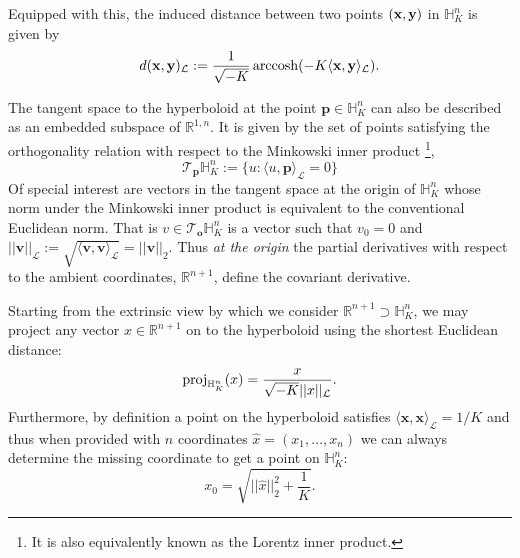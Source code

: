 Equipped with this, the induced distance between two points $(\mathbf{x},\mathbf{y})$ in $\mathbb{H}^{n}_K$ is given by
\begin{equation}
    d(\textbf{x},\textbf{y})_{\mathcal{L}} := \frac{1}{\sqrt{-K}}\operatorname{arccosh}(-K \langle \textbf{x}, \textbf{y} \rangle_{\mathcal{L}}).
\end{equation}

The tangent space to the hyperboloid at the point $\textbf{p} \in \mathbb{H}_K^n$ can also be described as an embedded subspace of $\mathbb{R}^{1,n}$.  
It is given by the set of points satisfying the orthogonality relation with respect to the Minkowski inner product \footnote{It is also equivalently known as the Lorentz inner product.},
\begin{equation}
   \mathcal{T}_{\textbf{p}}\mathbb{H}^{n}_K := \{ u: \langle u, \textbf{p} \rangle_{\mathcal{L}} = 0\}
\end{equation}
Of special interest are vectors in the tangent space at the origin of $\mathbb{H}^{n}_K$ whose norm under the Minkowski inner product is equivalent to the conventional Euclidean norm. That is $v \in \mathcal{T}_{\textbf{o}}\mathbb{H}^{n}_K$ is a vector such that $v_0 = 0$ and $||\textbf{v}||_{\mathcal{L}} := \sqrt{\langle \textbf{v}, \textbf{v}
\rangle_{\mathcal{L}}} = ||\textbf{v}||_2$.  Thus \emph{at the origin} the
partial derivatives with respect to the ambient coordinates, $\mathbb{R}^{n+1}$, define the
covariant derivative.  

Starting from the extrinsic view by which we consider $\mathbb{R}^{n+1} \supset \mathbb{H}^{n}_K$, we may project any vector $x \in \mathbb{R}^{n+1}$ on to the hyperboloid using the shortest Euclidean distance:
\begin{equation}
    \textnormal{proj}_{\mathbb{H}^{n}_K}(x) = \frac{x}{\sqrt{-K}||x||_{\mathcal{L}}}.
\end{equation}
Furthermore, by definition a point on the hyperboloid satisfies $\langle \textbf{x}, \textbf{x} \rangle_{\mathcal{L}} = 1/K$ and thus when provided with $n$ coordinates $\hat{x} = (x_1, \dots, x_{n})$ we can always determine the missing coordinate to get a point on $\mathbb{H}^n_K$:
\begin{equation}
    \label{eqn:hyperboloid_projection}
    x_0 = \sqrt{||\hat{x}||^2_2 + \frac{1}{K}}.
\end{equation}

